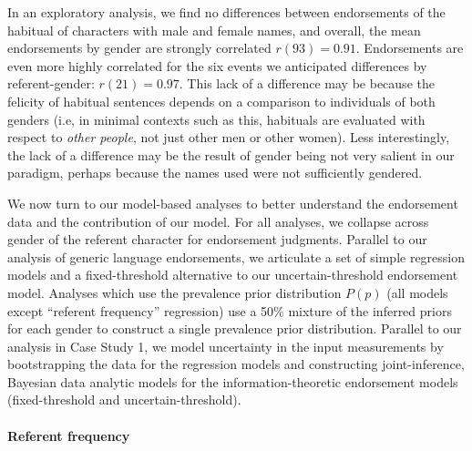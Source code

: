 \documentclass[english,,man,floatsintext]{apa6}
\let\oldparagraph\paragraph
\renewcommand{\paragraph}[1]{\oldparagraph{#1}\mbox{}}
\theoremstyle{definition}
\theoremstyle{definition}
\theoremstyle{definition}
\theoremstyle{remark}
\begin{document}
In an exploratory analysis, we find no differences between endorsements
of the habitual of characters with male and female names, and overall,
the mean endorsements by gender are strongly correlated
\(r(93) = 0.91\). Endorsements are even more highly correlated for the
six events we anticipated differences by referent-gender:
\(r(21) = 0.97\). This lack of a difference may be because the felicity
of habitual sentences depends on a comparison to individuals of both
genders (i.e, in minimal contexts such as this, habituals are evaluated
with respect to \emph{other people}, not just other men or other women).
Less interestingly, the lack of a difference may be the result of gender
being not very salient in our paradigm, perhaps because the names used
were not sufficiently gendered.

We now turn to our model-based analyses to better understand the
endorsement data and the contribution of our model. For all analyses, we
collapse across gender of the referent character for endorsement
judgments. Parallel to our analysis of generic language endorsements, we
articulate a set of simple regression models and a fixed-threshold
alternative to our uncertain-threshold endorsement model. Analyses which
use the prevalence prior distribution \(P(p)\) (all models except
\enquote{referent frequency} regression) use a 50\% mixture of the
inferred priors for each gender to construct a single prevalence prior
distribution. Parallel to our analysis in Case Study 1, we model
uncertainty in the input measurements by bootstrapping the data for the
regression models and constructing joint-inference, Bayesian data
analytic models for the information-theoretic endorsement models
(fixed-threshold and uncertain-threshold).

\hypertarget{referent-frequency}{%
\paragraph{Referent frequency}\label{referent-frequency}}
\end{document}
